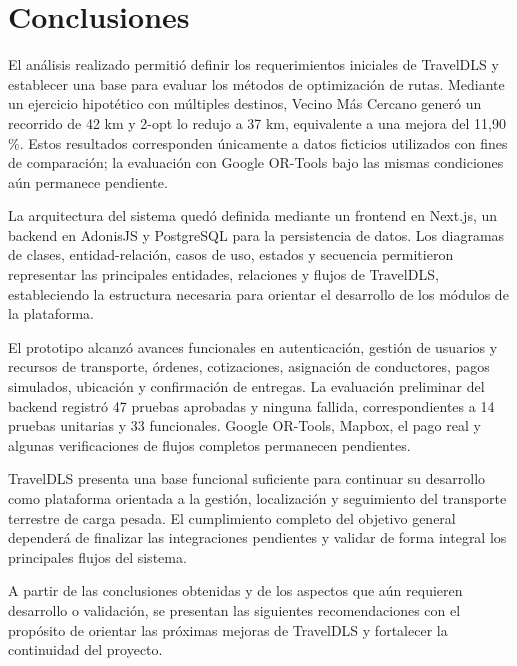 
\section{Conclusiones}

El análisis realizado permitió definir los requerimientos iniciales de TravelDLS y establecer una base para evaluar los métodos de optimización de rutas. Mediante un ejercicio hipotético con múltiples destinos, Vecino Más Cercano generó un recorrido de 42 km y 2-opt lo redujo a 37 km, equivalente a una mejora del 11,90 \%. Estos resultados corresponden únicamente a datos ficticios utilizados con fines de comparación; la evaluación con Google OR-Tools bajo las mismas condiciones aún permanece pendiente.

La arquitectura del sistema quedó definida mediante un frontend en Next.js, un backend en AdonisJS y PostgreSQL para la persistencia de datos. Los diagramas de clases, entidad-relación, casos de uso, estados y secuencia permitieron representar las principales entidades, relaciones y flujos de TravelDLS, estableciendo la estructura necesaria para orientar el desarrollo de los módulos de la plataforma.

El prototipo alcanzó avances funcionales en autenticación, gestión de usuarios y recursos de transporte, órdenes, cotizaciones, asignación de conductores, pagos simulados, ubicación y confirmación de entregas. La evaluación preliminar del backend registró 47 pruebas aprobadas y ninguna fallida, correspondientes a 14 pruebas unitarias y 33 funcionales. Google OR-Tools, Mapbox, el pago real y algunas verificaciones de flujos completos permanecen pendientes.

TravelDLS presenta una base funcional suficiente para continuar su desarrollo como plataforma orientada a la gestión, localización y seguimiento del transporte terrestre de carga pesada. El cumplimiento completo del objetivo general dependerá de finalizar las integraciones pendientes y validar de forma integral los principales flujos del sistema.

A partir de las conclusiones obtenidas y de los aspectos que aún requieren desarrollo o validación, se presentan las siguientes recomendaciones con el propósito de orientar las próximas mejoras de TravelDLS y fortalecer la continuidad del proyecto.